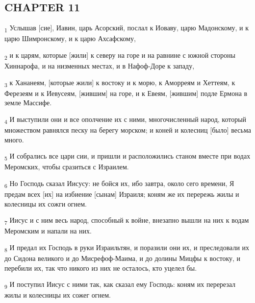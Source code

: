 \subsection{CHAPTER 11}
\begin{tcolorbox}
\textsubscript{1} Услышав [сие], Иавин, царь Асорский, послал к Иоваву, царю Мадонскому, и к царю Шимронскому, и к царю Ахсафскому,
\end{tcolorbox}
\begin{tcolorbox}
\textsubscript{2} и к царям, которые [жили] к северу на горе и на равнине с южной стороны Хиннарофа, и на низменных местах, и в Нафоф-Доре к западу,
\end{tcolorbox}
\begin{tcolorbox}
\textsubscript{3} к Хананеям, [которые жили] к востоку и к морю, к Аморреям и Хеттеям, к Ферезеям и к Иевусеям, [жившим] на горе, и к Евеям, [жившим] подле Ермона в земле Массифе.
\end{tcolorbox}
\begin{tcolorbox}
\textsubscript{4} И выступили они и все ополчение их с ними, многочисленный народ, который множеством равнялся песку на берегу морском; и коней и колесниц [было] весьма много.
\end{tcolorbox}
\begin{tcolorbox}
\textsubscript{5} И собрались все цари сии, и пришли и расположились станом вместе при водах Меромских, чтобы сразиться с Израилем.
\end{tcolorbox}
\begin{tcolorbox}
\textsubscript{6} Но Господь сказал Иисусу: не бойся их, ибо завтра, около сего времени, Я предам всех [их] на избиение [сынам] Израиля; коням же их перережь жилы и колесницы их сожги огнем.
\end{tcolorbox}
\begin{tcolorbox}
\textsubscript{7} Иисус и с ним весь народ, способный к войне, внезапно вышли на них к водам Меромским и напали на них.
\end{tcolorbox}
\begin{tcolorbox}
\textsubscript{8} И предал их Господь в руки Израильтян, и поразили они их, и преследовали их до Сидона великого и до Мисрефоф-Маима, и до долины Мицфы к востоку, и перебили их, так что никого из них не осталось, кто уцелел бы.
\end{tcolorbox}
\begin{tcolorbox}
\textsubscript{9} И поступил Иисус с ними так, как сказал ему Господь: коням их перерезал жилы и колесницы их сожег огнем.
\end{tcolorbox}
